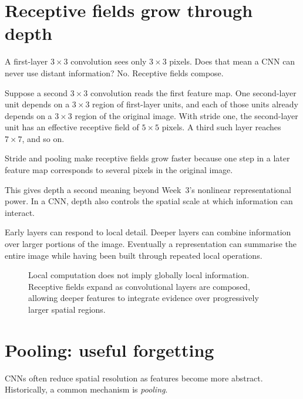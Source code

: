 \section{Receptive fields grow through depth}

A first-layer \(3\times3\) convolution sees only \(3\times3\) pixels. Does that mean a CNN can never use distant information? No. Receptive fields compose.

Suppose a second \(3\times3\) convolution reads the first feature map. One second-layer unit depends on a \(3\times3\) region of first-layer units, and each of those units already depends on a \(3\times3\) region of the original image. With stride one, the second-layer unit has an effective receptive field of \(5\times5\) pixels. A third such layer reaches \(7\times7\), and so on.

Stride and pooling make receptive fields grow faster because one step in a later feature map corresponds to several pixels in the original image.

This gives depth a second meaning beyond Week~3's nonlinear representational power. In a CNN, depth also controls the spatial scale at which information can interact.

Early layers can respond to local detail. Deeper layers can combine information over larger portions of the image. Eventually a representation can summarise the entire image while having been built through repeated local operations.

\begin{figure}[ht]
  \caption{Local computation does not imply globally local information. Receptive fields expand as convolutional layers are composed, allowing deeper features to integrate evidence over progressively larger spatial regions.}
  \label{fig:week5-receptive-field}
\end{figure}

\section{Pooling: useful forgetting}

CNNs often reduce spatial resolution as features become more abstract. Historically, a common mechanism is \emph{pooling}.

